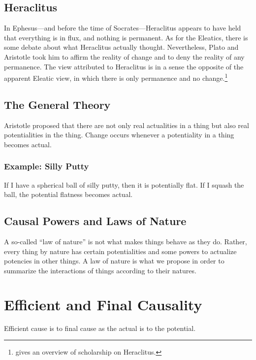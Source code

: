 \documentclass[twocolumn]{article}
\begin{document}
\subsection{Heraclitus}

In Ephesus---and before the time of Socrates---Heraclitus appears to have held
that everything is in flux, and nothing is permanent.  As for the Eleatics,
there is some debate about what Heraclitus actually thought.  Nevertheless,
Plato and Aristotle took him to affirm the reality of change and to deny the
reality of any permanence.  The view attributed to Heraclitus is in a sense the
opposite of the apparent Eleatic view, in which there is only permanence and no
change.\footnote{%
   \cite{g2015} gives an overview of scholarship on Heraclitus.%
}

\subsection{The General Theory}

Aristotle proposed that there are not only real actualities in a thing but also
real potentialities in the thing.  Change occurs whenever a potentiality in a
thing becomes actual.

\subsubsection{Example: Silly Putty}

If I have a spherical ball of silly putty, then it is potentially flat.  If I
squash the ball, the potential flatness becomes actual.

\subsection{Causal Powers and Laws of Nature}

A so-called ``law of nature'' is not what makes things behave as they do.
Rather, every thing by nature has certain potentialities and some powers to
actualize potencies in other things.  A law of nature is what we propose in
order to summarize the interactions of things according to their natures.

\section{Efficient and Final Causality}

Efficient cause is to final cause as the actual is to the potential.
\end{document}
